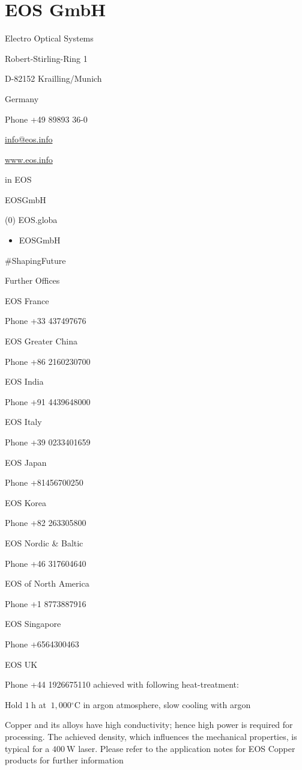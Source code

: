 \documentclass[10pt]{article}
\begin{document}
\section*{EOS GmbH}
Electro Optical Systems

Robert-Stirling-Ring 1

D-82152 Krailling/Munich

Germany

Phone +49 89893 36-0

\href{mailto:info@eos.info}{info@eos.info}

\href{http://www.eos.info}{www.eos.info}

in EOS

EOSGmbH

(0) EOS.globa

\begin{itemize}
  \item EOSGmbH
\end{itemize}

\#ShapingFuture

Further Offices

EOS France

Phone +33 437497676

EOS Greater China

Phone +86 2160230700

EOS India

Phone +91 4439648000

EOS Italy

Phone +39 0233401659

EOS Japan

Phone +81456700250

EOS Korea

Phone +82 263305800

EOS Nordic \& Baltic

Phone +46 317604640

EOS of North America

Phone +1 8773887916

EOS Singapore

Phone +6564300463

EOS UK

Phone +44 1926675110 achieved with following heat-treatment:

Hold $1 \mathrm{~h}$ at $~ 1,000{ }^{\circ} \mathrm{C}$ in argon atmosphere, slow cooling with argon

Copper and its alloys have high conductivity; hence high power is required for processing. The achieved density, which influences the mechanical properties, is typical for a $400 \mathrm{~W}$ laser. Please refer to the application notes for EOS Copper products for further information
\end{document}
